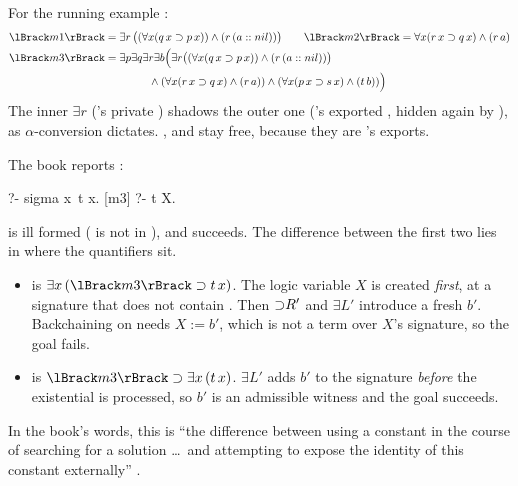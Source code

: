 For the running example :
\begin{align*}
\hoprogT{m1} &= \exists r\,\big((\forall x(q\,x\imp p\,x))\wedge (r\,(a::nil))\big)\qquad
\hoprogT{m2} = \forall x(r\,x\imp q\,x)\wedge(r\,a)\\
\hoprogT{m3} &= \exists p\exists q\exists r\exists b\Big(\exists r\big((\forall x(q\,x\imp p\,x))\wedge(r\,(a::nil))\big)\\
&\qquad\qquad\wedge(\forall x(r\,x\imp q\,x)\wedge(r\,a))\wedge(\forall x(p\,x\imp s\,x)\wedge(t\,b))\Big)
\end{align*}
The inner $\exists r$ ('s private ) shadows the outer one ('s exported , hidden
again by ), as $\alpha$-conversion dictates. ,  and  stay free, because they are
's exports.

\begin{tutorial}
The book reports :
\begin{lprolog}
[m3] ?- sigma x\ t x.      %
[m3] ?- t X.               %
\end{lprolog}
 is ill formed ( is not in ), and  succeeds. The
difference between the first two lies in where the quantifiers sit.
\begin{itemize}
\item {} is $\exists x\,(\hoprogT{m3}\imp t\,x)$. The logic variable $X$ is created \emph{first}, at a
  signature that does not contain . Then ${\supset}R'$ and $\exists L'$ introduce a fresh $b'$.
  Backchaining on  needs $X := b'$, which is not a term over $X$'s signature, so the goal fails.
\item {} is $\hoprogT{m3}\imp\exists x\,(t\,x)$. $\exists L'$ adds $b'$ to the signature
  \emph{before} the existential is processed, so $b'$ is an admissible witness and the goal succeeds.
\end{itemize}
In the book's words, this is ``the difference between using a constant in the course of searching for a
solution \ldots\ and attempting to expose the identity of this constant externally'' .
\end{tutorial}

